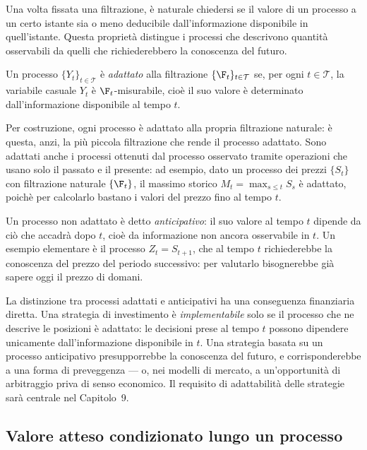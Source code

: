 \noindent
Una volta fissata una filtrazione, \`{e} naturale chiedersi se il
valore di un processo a un certo istante sia o meno deducibile
dall'informazione disponibile in quell'istante. Questa propriet\`{a}
distingue i processi che descrivono quantit\`{a} osservabili da quelli
che richiederebbero la conoscenza del futuro.

\begin{definition}
\label{def:adattato}
Un processo $\{Y_t\}_{t\in\mathcal{T}}$ \`{e} \emph{adattato} alla
filtrazione $\{\F_t\}_{t\in\mathcal{T}}$ se, per ogni
$t\in\mathcal{T}$, la variabile casuale $Y_t$ \`{e}
$\F_t$-misurabile, cio\`{e} il suo valore \`{e} determinato
dall'informazione disponibile al tempo $t$.
\end{definition}

Per costruzione, ogni processo \`{e} adattato alla propria filtrazione
naturale: \`{e} questa, anzi, la pi\`{u} piccola filtrazione che rende
il processo adattato. Sono adattati anche i processi ottenuti dal
processo osservato tramite operazioni che usano solo il passato e il
presente: ad esempio, dato un processo dei prezzi $\{S_t\}$ con
filtrazione naturale $\{\F_t\}$, il massimo storico $M_t=\max_{s\leq
t}S_s$ \`{e} adattato, poich\`{e} per calcolarlo bastano i valori del
prezzo fino al tempo $t$.

Un processo non adattato \`{e} detto \emph{anticipativo}: il suo
valore al tempo $t$ dipende da ci\`{o} che accadr\`{a} dopo $t$,
cio\`{e} da informazione non ancora osservabile in $t$. Un esempio
elementare \`{e} il processo $Z_t=S_{t+1}$, che al tempo $t$
richiederebbe la conoscenza del prezzo del periodo successivo: per
valutarlo bisognerebbe gi\`{a} sapere oggi il prezzo di domani.

\begin{remark}
La distinzione tra processi adattati e anticipativi ha una
conseguenza finanziaria diretta. Una strategia di investimento
\`{e} \emph{implementabile} solo se il processo che ne descrive le
posizioni \`{e} adattato: le decisioni prese al tempo $t$ possono
dipendere unicamente dall'informazione disponibile in $t$. Una
strategia basata su un processo anticipativo presupporrebbe la
conoscenza del futuro, e corrisponderebbe a una forma di
preveggenza --- o, nei modelli di mercato, a un'opportunit\`{a} di
arbitraggio priva di senso economico. Il requisito di adattabilit\`{a}
delle strategie sar\`{a} centrale nel Capitolo~9.
\end{remark}

\subsection{Valore atteso condizionato lungo un processo}

